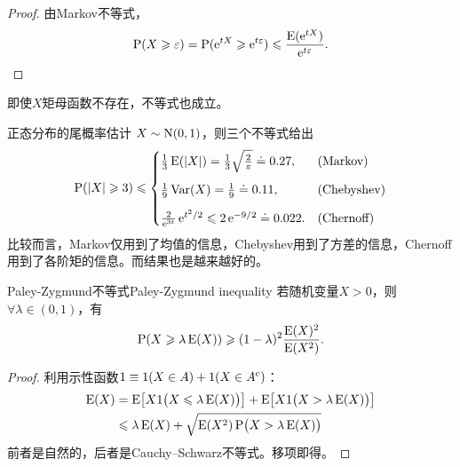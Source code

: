 \begin{proof}
	由Markov不等式，
	\[
		\operatorname{P}(X\geqslant\varepsilon)=\operatorname{P}(\mathop{}\!\mathrm{e}^{tX}\geqslant\mathop{}\!\mathrm{e}^{t\varepsilon})\leqslant\frac{\operatorname{E}(\mathop{}\!\mathrm{e}^{tX})}{\mathop{}\!\mathrm{e}^{t\varepsilon}}.
		\qedhere
	\]
\end{proof}
\begin{remark}
	即使$X$矩母函数不存在，不等式也成立。
\end{remark}

\begin{example}{正态分布的尾概率估计}{}
	$X\sim\operatorname{N}(0,1)$，则三个不等式给出
	\[
		\operatorname{P}(|X|\geqslant 3)\leqslant\begin{cases}
			\frac13\operatorname{E}(\left\lvert X\right\rvert)=\frac13\sqrt{\frac2\pi}\doteq 0.27,&\text{(Markov)}\\[2ex]
			\frac19\operatorname{Var}(X)=\frac19\doteq 0.11,&\text{(Chebyshev)}\\[2ex]
			\frac{2}{\mathop{}\!\mathrm{e}^{3t}}\mathop{}\!\mathrm{e}^{t^2/2}\leqslant 2\mathop{}\!\mathrm{e}^{-9/2}\doteq 0.022.&\text{(Chernoff)}
		\end{cases}
	\]
	比较而言，Markov仅用到了均值的信息，Chebyshev用到了方差的信息，Chernoff用到了各阶矩的信息。而结果也是越来越好的。
\end{example}

\begin{theorem}
	{Paley-Zygmund不等式}{Paley-Zygmund inequality}
	若随机变量$X>0$，则$\forall\lambda\in(0,1)$，有
	\begin{equation}
		\label{eq:Paley-Zygmund ineq}
		\operatorname{P}(X\geqslant\lambda\operatorname{E}(X))\geqslant(1-\lambda)^2\frac{\operatorname{E}(X)^2}{\operatorname{E}(X^2)}.
	\end{equation}
\end{theorem}

\begin{proof}
	利用示性函数$1\equiv 1(X\in A)+1(X\in A^\mathrm{c})$：
	\begin{align*}
		\operatorname{E}(X)&=\operatorname{E}\bigl[X1\bigl(X\leqslant\lambda\operatorname{E}(X)\bigr)\bigr]+\operatorname{E}\bigl[X1\bigl(X>\lambda\operatorname{E}(X)\bigr)\bigr]\\
		&\leqslant\lambda\operatorname{E}(X)+\sqrt{\operatorname{E}(X^2)\operatorname{P}\bigl(X>\lambda\operatorname{E}(X)\bigr)}
	\end{align*}
	前者是自然的，后者是Cauchy–Schwarz不等式。移项即得。
\end{proof}

